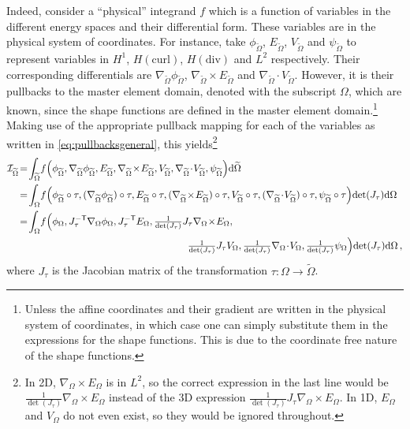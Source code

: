 Indeed, consider a ``physical'' integrand $f$ which is a function of variables in the different energy spaces and their differential form.
These variables are in the physical system of coordinates.
For instance, take $\phi_{\tilde{\Omega}}$, $E_{\tilde{\Omega}}$, $V_{\tilde{\Omega}}$ and $\psi_{\tilde{\Omega}}$ to represent variables in $H^1$, $H(\mathrm{curl})$, $H(\mathrm{div})$ and $L^2$ respectively.
Their corresponding differentials are $\nabla_{\tilde{\Omega}}\phi_{\tilde{\Omega}}$, $\nabla_{\tilde{\Omega}}\!\times\!E_{\tilde{\Omega}}$ and $\nabla_{\tilde{\Omega}}\!\cdot\!V_{\tilde{\Omega}}$.
However, it is their pullbacks to the master element domain, denoted with the subscript $\Omega$, which are known, since the shape functions are defined in the master element domain.\footnote{Unless the affine coordinates and their gradient are written in the physical system of coordinates, in which case one can simply substitute them in the expressions for the shape functions. This is due to the coordinate free nature of the shape functions.}
Making use of the appropriate pullback mapping for each of the variables as written in \eqref{eq:pullbacksgeneral}, this yields\footnote{In 2D, $\nabla_{\Omega}\!\times\!E_{\Omega}$ is in $L^2$, so the correct expression in the last line would be $\frac{1}{\det(J_\tau)}\nabla_{\Omega}\!\times\!E_{\Omega}$ instead of the 3D expression $\frac{1}{\det(J_\tau)}J_\tau\nabla_{\Omega}\!\times\!E_{\Omega}$. In 1D, $E_{\Omega}$ and $V_{\Omega}$ do not even exist, so they would be ignored throughout.}
\begin{equation}
	\begin{aligned}
		\mathcal{I}_{\tilde{\Omega}}&\!=\!\int_{\tilde{\Omega}}\!
			f\Big(\phi_{\tilde{\Omega}},\nabla_{\tilde{\Omega}}\phi_{\tilde{\Omega}},
				E_{\tilde{\Omega}},\nabla_{\tilde{\Omega}}\!\times\!E_{\tilde{\Omega}}, 
					V_{\tilde{\Omega}},\nabla_{\tilde{\Omega}}\!\cdot\!V_{\tilde{\Omega}}, \psi_{\tilde{\Omega}}\Big)\mathrm{d}\tilde{\Omega}\\
			&\!=\!\int_{\Omega}\!f\Big(\phi_{\tilde{\Omega}}\circ\tau, (\nabla_{\tilde{\Omega}}\phi_{\tilde{\Omega}})\circ\tau,
				E_{\tilde{\Omega}}\circ\tau,(\nabla_{\tilde{\Omega}}\!\times\!E_{\tilde{\Omega}})\circ\tau, 
					V_{\tilde{\Omega}}\circ\tau,(\nabla_{\tilde{\Omega}}\!\cdot\!V_{\tilde{\Omega}})\circ\tau,
						\psi_{\tilde{\Omega}}\circ\tau\Big)\!\det(J_\tau)\mathrm{d}\Omega\\
			&\!=\!\int_{\Omega}\!f\Big(\phi_{\Omega},J_\tau^{-\T}\nabla_{\Omega}\phi_{\Omega},
				J_\tau^{-\T}E_{\Omega},\textstyle{\frac{1}{\det(J_\tau)}}J_\tau\nabla_{\Omega}\!\times\!E_{\Omega},\\
					&\qquad\qquad\qquad\qquad\qquad\qquad\qquad\qquad\quad
						\textstyle{\frac{1}{\det(J_\tau)}}J_\tau V_{\Omega},\textstyle{\frac{1}{\det(J_\tau)}}\nabla_{\Omega}\!\cdot\!V_{\Omega},
							\textstyle{\frac{1}{\det(J_\tau)}}\psi_{\Omega}\Big)\!\det(J_\tau)\mathrm{d}\Omega\,,
	\end{aligned}
	\label{eq:integraluptomaster}
\end{equation}
where $J_\tau$ is the Jacobian matrix of the transformation $\tau:\Omega\rightarrow\tilde{\Omega}$.


